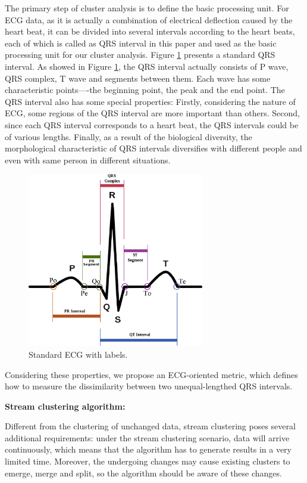 \documentclass[conference]{IEEEtran}
\begin{document}
The primary step of cluster analysis is to define the basic processing unit. For ECG data, as it is actually a combination of electrical deflection caused by the heart beat, it can be divided into several intervals according to the heart beats, each of which is called as QRS interval in this paper and used as the basic processing unit for our cluster analysis. Figure \ref{fig_ECG_lable} presents a standard QRS interval. As showed in Figure \ref{fig_ECG_lable}, the QRS interval actually consists of P wave, QRS complex, T wave and segments between them. Each wave has some characteristic points----the beginning point, the peak and the end point. The QRS interval also has some special properties: Firstly, considering the nature of ECG, some regions of the QRS interval are more important than others. Second, since each QRS interval corresponds to a heart beat, the QRS intervals could be of various lengths. Finally, as a result of the biological diversity, the morphological characteristic of QRS intervals diversifies with different people and even with same person in different situations.
\begin{figure}[!t]
\centering
\includegraphics[height=3.0in]{./Figure/rr_interval_label.eps}
\caption{Standard ECG with labels.}
\label{fig_ECG_lable}
\end{figure}


Considering these properties, we propose an ECG-oriented metric, which defines how to measure the dissimilarity between two unequal-lengthed QRS intervals.


\textbf{Stream clustering algorithm:}


Different from the clustering of unchanged data, stream clustering poses several additional requirements: under the stream clustering scenario, data will arrive continuously, which means that the algorithm has to generate results in a very limited time. Moreover, the undergoing changes may cause existing clusters to emerge, merge and split, so the algorithm should be aware of these changes.
\end{document}

